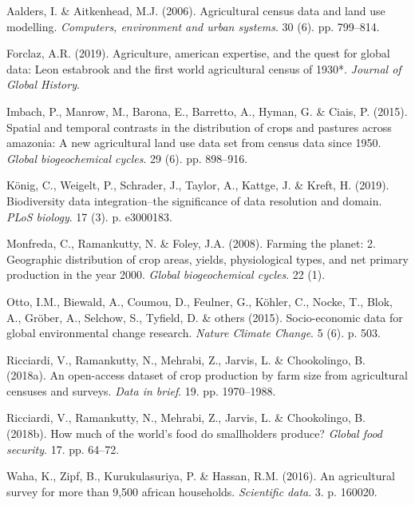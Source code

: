 \documentclass[12pt,]{article}
\begin{document}
\hypertarget{refs}{}
\leavevmode\hypertarget{ref-Aalders2006}{}%
Aalders, I. \& Aitkenhead, M.J. (2006). Agricultural census data and land use modelling. \emph{Computers, environment and urban systems}. 30 (6). pp. 799--814.

\leavevmode\hypertarget{ref-Forclaz2016}{}%
Forclaz, A.R. (2019). Agriculture, american expertise, and the quest for global data: Leon estabrook and the first world agricultural census of 1930*. \emph{Journal of Global History}.

\leavevmode\hypertarget{ref-Imbach2015}{}%
Imbach, P., Manrow, M., Barona, E., Barretto, A., Hyman, G. \& Ciais, P. (2015). Spatial and temporal contrasts in the distribution of crops and pastures across amazonia: A new agricultural land use data set from census data since 1950. \emph{Global biogeochemical cycles}. 29 (6). pp. 898--916.

\leavevmode\hypertarget{ref-Koenig2019}{}%
König, C., Weigelt, P., Schrader, J., Taylor, A., Kattge, J. \& Kreft, H. (2019). Biodiversity data integration--the significance of data resolution and domain. \emph{PLoS biology}. 17 (3). p. e3000183.

\leavevmode\hypertarget{ref-Monfreda2008}{}%
Monfreda, C., Ramankutty, N. \& Foley, J.A. (2008). Farming the planet: 2. Geographic distribution of crop areas, yields, physiological types, and net primary production in the year 2000. \emph{Global biogeochemical cycles}. 22 (1).

\leavevmode\hypertarget{ref-Otto2015}{}%
Otto, I.M., Biewald, A., Coumou, D., Feulner, G., Köhler, C., Nocke, T., Blok, A., Gröber, A., Selchow, S., Tyfield, D. \& others (2015). Socio-economic data for global environmental change research. \emph{Nature Climate Change}. 5 (6). p. 503.

\leavevmode\hypertarget{ref-Ricciardi2018a}{}%
Ricciardi, V., Ramankutty, N., Mehrabi, Z., Jarvis, L. \& Chookolingo, B. (2018a). An open-access dataset of crop production by farm size from agricultural censuses and surveys. \emph{Data in brief}. 19. pp. 1970--1988.

\leavevmode\hypertarget{ref-Ricciardi2018}{}%
Ricciardi, V., Ramankutty, N., Mehrabi, Z., Jarvis, L. \& Chookolingo, B. (2018b). How much of the world's food do smallholders produce? \emph{Global food security}. 17. pp. 64--72.

\leavevmode\hypertarget{ref-Waha2016}{}%
Waha, K., Zipf, B., Kurukulasuriya, P. \& Hassan, R.M. (2016). An agricultural survey for more than 9,500 african households. \emph{Scientific data}. 3. p. 160020.
\end{document}
